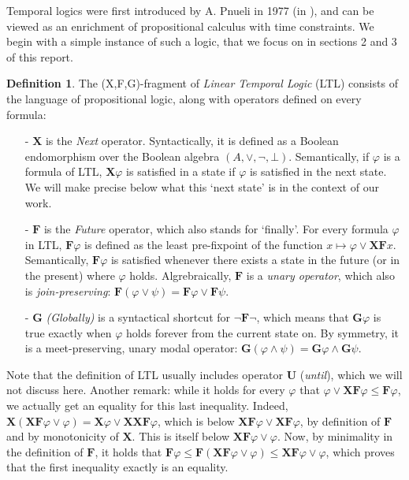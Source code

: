 \documentclass[11pt]{article}
\newcommand{\X}{{\mathbf{X}}}
\newcommand{\F}{{\mathbf{F}}}
\newcommand{\orr}{{\vee}}
\newcommand{\andd}{{\wedge}}
\newcommand{\phii}{{\varphi}}
\newcommand{\G}{{\mathbf{G}}}
\theoremstyle{definition}
\newtheorem*{definition}{Definition}
\begin{document}
Temporal logics were first introduced by A. Pnueli in 1977 (in \cite{Pnu77}), and can be
viewed as an enrichment of propositional calculus with time constraints. We begin with a simple
instance of such a logic, that we focus on in sections 2 and 3 of this report.

\begin{definition}\label{LTL}
    The (X,F,G)-fragment of \emph{Linear Temporal Logic} (LTL) 
    consists of the language of propositional logic, along with
    operators defined on every formula:
    \begin{itemize}
        \item[-] $\X$ is the \emph{Next} operator. Syntactically, it is defined as a Boolean 
            endomorphism over the Boolean algebra $(A,\orr,\neg,\bot)$. Semantically, if $\phii$ is 
            a formula of LTL, $\X\phii$ is 
            satisfied in a state if $\phii$ is satisfied in the next state. We will make precise below what this
            `next state' is in the context of our work.
        \item[-] $\F$ is the \emph{Future} operator, which also stands for `finally'.
            For every formula $\phii$ in LTL, $\F\phii$ is defined as the least pre-fixpoint of the
            function $x\mapsto \phii\orr\X\F x$. Semantically, $\F\phii$ is satisfied whenever there
            exists a state in the future (or in the present) where $\phii$ holds. Algrebraically,
            $\F$ is a \emph{unary operator}, which also is \emph{join-preserving}:
            $\F(\phii\orr\psi)=\F\phii\orr\F\psi$.
        \item[-]$\G$ \emph{(Globally)} is a syntactical shortcut for $\neg\F\neg$, which means that $\G\phii$ is true 
            exactly when
            $\phii$ holds forever from the current state on. By symmetry, it is a meet-preserving,
            unary modal operator: $\G(\phii\andd\psi)=\G\phii\andd\G\psi$.
    \end{itemize}
\end{definition}
Note that the definition of LTL usually includes operator $\mathbf{U}$ (\emph{until}), which we will not
discuss here.
Another remark: while it holds for every $\phii$ that $\phii\orr\X\F\phii\leq\F\phii$, we actually
get an equality for this last inequality. Indeed, $\X(\X\F\phii\orr\phii)=\X\phii\orr\X\X\F\phii$,
which is below $\X\F\phii\orr\X\F\phii$, by definition of $\F$ and by monotonicity of $\X$. This
is itself below $\X\F\phii\orr\phii$. Now, by minimality in the definition of $\F$, it holds that
$\F\phii\leq\F(\X\F\phii\orr\phii)\leq\X\F\phii\orr\phii$, which proves that the first inequality
exactly is an equality.
\end{document}
